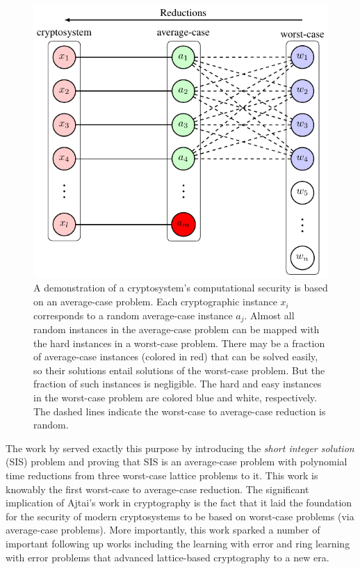 \documentclass[../main.tex]{subfiles}
\begin{document}
\begin{figure}[h!]
    \centering
    \includegraphics[page=1]{images/Lattice_crypto_tikz_folder.pdf}    
    \caption{A demonstration of a cryptosystem's computational security is based on an average-case problem. Each cryptographic instance $x_i$ corresponds to a random average-case instance $a_j$. Almost all random instances in the average-case problem can be mapped with the hard instances in a worst-case problem. There may be a fraction of average-case instances (colored in red) that can be solved easily, so their solutions entail solutions of the worst-case problem. But the fraction of such instances is negligible. The hard and easy instances in the worst-case problem are colored blue and white, respectively. The dashed lines indicate the worst-case to average-case reduction is random.}
    \label{fig:average2worst}
\end{figure}

The work by \citet{ajtai1996generating} served exactly this purpose by introducing the \textit{short integer solution} (SIS) problem and proving that SIS is an average-case problem with polynomial time reductions from three worst-case lattice problems to it. This work is knowably the first worst-case to average-case reduction. The significant implication of Ajtai's work in cryptography is the fact that it laid the foundation for the security of modern cryptosystems to be based on worst-case problems (via average-case problems). 
More importantly, this work sparked a number of important following up works including the learning with error and ring learning with error problems that advanced lattice-based cryptography to a new era. 





%
%
\end{document}
